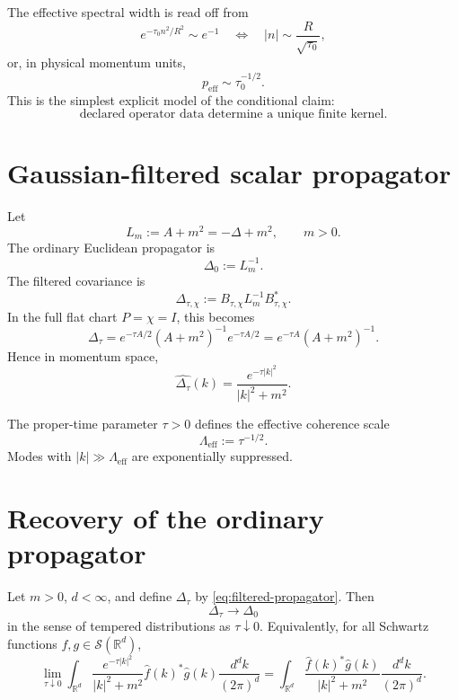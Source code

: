 \documentclass[11pt]{article}
\begin{document}
The effective spectral width is read off from
\[
        e^{-\tau_0 n^2/R^2}\sim e^{-1}
        \quad\Longleftrightarrow\quad
        |n|\sim \frac{R}{\sqrt{\tau_0}},
\]
or, in physical momentum units,
\[
        p_{\mathrm{eff}}\sim \tau_0^{-1/2}.
\]
This is the simplest explicit model of the conditional claim:
\[
        \boxed{
        \text{declared operator data determine a unique finite kernel.}
        }
\]


\section{Gaussian-filtered scalar propagator}

Let
\[
        L_m := A+m^2 = -\Delta+m^2,
        \qquad m>0.
\]
The ordinary Euclidean propagator is
\[
        \Delta_0 := L_m^{-1}.
\]
The filtered covariance is
\[
        \Delta_{\tau,\chi}
        :=
        B_{\tau,\chi}L_m^{-1}B_{\tau,\chi}^{\ast}.
\]
In the full flat chart \(P=\chi=I\), this becomes
\[
        \Delta_\tau
        =
        e^{-\tau A/2}(A+m^2)^{-1}e^{-\tau A/2}
        =
        e^{-\tau A}(A+m^2)^{-1}.
\]
Hence in momentum space,
\begin{equation}
        \label{eq:filtered-propagator}
        \widehat{\Delta_\tau}(k)
        =
        \frac{e^{-\tau |k|^2}}{|k|^2+m^2}.
\end{equation}

\begin{definition}
The proper-time parameter \(\tau>0\) defines the effective coherence scale
\[
        \Lambda_{\mathrm{eff}}
        :=
        \tau^{-1/2}.
\]
Modes with \(|k|\gg \Lambda_{\mathrm{eff}}\) are exponentially suppressed.
\end{definition}

\section{Recovery of the ordinary propagator}

\begin{theorem}
Let \(m>0\), \(d<\infty\), and define \(\Delta_\tau\) by \cref{eq:filtered-propagator}. Then
\[
        \Delta_\tau \longrightarrow \Delta_0
\]
in the sense of tempered distributions as \(\tau\downarrow0\). Equivalently, for all Schwartz functions \(f,g\in\mathcal S(\mathbb R^d)\),
\[
        \lim_{\tau\downarrow0}
        \int_{\mathbb R^d}
        \frac{e^{-\tau |k|^2}}{|k|^2+m^2}
        \widehat f(k)^\ast \widehat g(k)
        \frac{d^dk}{(2\pi)^d}
        =
        \int_{\mathbb R^d}
        \frac{\widehat f(k)^\ast \widehat g(k)}{|k|^2+m^2}
        \frac{d^dk}{(2\pi)^d}.
\]
\end{theorem}
\end{document}
